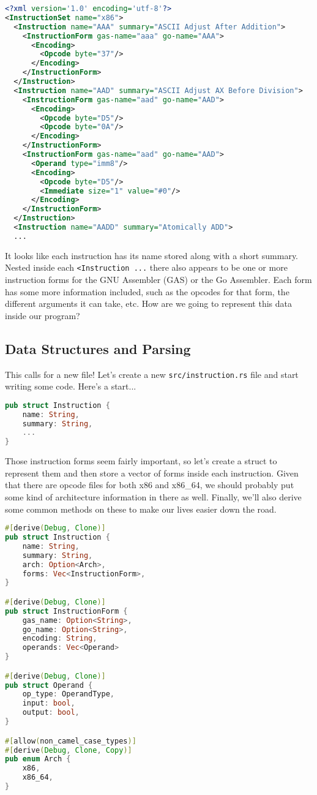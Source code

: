 \begin{lstlisting}[language=xml]
<?xml version='1.0' encoding='utf-8'?>
<InstructionSet name="x86">
  <Instruction name="AAA" summary="ASCII Adjust After Addition">
    <InstructionForm gas-name="aaa" go-name="AAA">
      <Encoding>
        <Opcode byte="37"/>
      </Encoding>
    </InstructionForm>
  </Instruction>
  <Instruction name="AAD" summary="ASCII Adjust AX Before Division">
    <InstructionForm gas-name="aad" go-name="AAD">
      <Encoding>
        <Opcode byte="D5"/>
        <Opcode byte="0A"/>
      </Encoding>
    </InstructionForm>
    <InstructionForm gas-name="aad" go-name="AAD">
      <Operand type="imm8"/>
      <Encoding>
        <Opcode byte="D5"/>
        <Immediate size="1" value="#0"/>
      </Encoding>
    </InstructionForm>
  </Instruction>
  <Instruction name="AADD" summary="Atomically ADD">
  ...
\end{lstlisting}

It looks like each instruction has its name stored along with 
a short summary. Nested inside each \texttt{<Instruction ...} there also appears
to be one or more instruction forms for the GNU Assembler (GAS) or the Go Assembler.
Each form has some more information included, such as the opcodes for that form,
the different arguments it can take, etc. How are we going to represent this data
inside our program?

\subsection{Data Structures and Parsing}

This calls for a new file! Let's create a new \texttt{src/instruction.rs} file and
start writing some code. Here's a start...

\begin{lstlisting}[language=rust]
pub struct Instruction {
    name: String,
    summary: String,
    ...
}
\end{lstlisting}

Those instruction forms seem fairly important, so let's create a struct to represent
them and then store a vector of forms inside each instruction. Given that there
are opcode files for both x86 and x86\_64, we should probably put some kind of
architecture information in there as well. Finally, we'll also derive some common
methods on these to make our lives easier down the road.

\begin{lstlisting}[language=rust]
#[derive(Debug, Clone)]
pub struct Instruction {
    name: String,
    summary: String,
    arch: Option<Arch>,
    forms: Vec<InstructionForm>,
}

#[derive(Debug, Clone)]
pub struct InstructionForm {
    gas_name: Option<String>,
    go_name: Option<String>,
    encoding: String,
    operands: Vec<Operand>
}

#[derive(Debug, Clone)]
pub struct Operand {
    op_type: OperandType,
    input: bool,
    output: bool,
}

#[allow(non_camel_case_types)]
#[derive(Debug, Clone, Copy)]
pub enum Arch {
    x86,
    x86_64,
}
\end{lstlisting}

